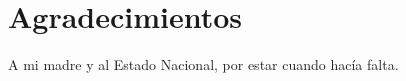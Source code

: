 \chapter*{Agradecimientos}

\noindent A mi madre y al Estado Nacional, por estar cuando hacía falta.
